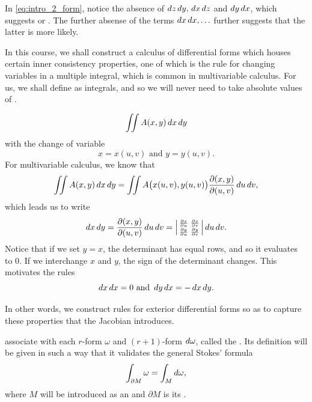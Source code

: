 \documentclass[notoc,notitlepage]{tufte-book}
\begin{document}
In \cref{eq:intro_2_form}, notice the absence of $\mathop{}\!d{z} \mathop{}\!d{y},\, \mathop{}\!d{x}
\mathop{}\!d{z}$ and $\mathop{}\!d{y} \mathop{}\!d{x}$, which suggests  or
. The further absense of the terms $\mathop{}\!d{x} \mathop{}\!d{x},
\ldots$ further suggests that the latter is more likely.

In this course, we shall construct a calculus of differential forms which houses
certain inner consistency properties, one of which is the rule for changing
variables in a multiple integral, which is common in multivariable calculus. For
us, we shall define  as  integrals, and so
we will never need to take absolute values of .

\begin{equation*}
  \iint A(x, y) \mathop{}\!d{x} \mathop{}\!d{y}
\end{equation*}
with the change of variable
\begin{equation*}
  x = x(u, v) \text{ and } y = y(u, v).
\end{equation*}
For multivariable calculus, we know that
\begin{equation*}
  \iint A(x, y) \mathop{}\!d{x} \mathop{}\!d{y} = \iint A \big( x(u, v), y(u, v) \big)
  \frac{\partial(x, y)}{\partial (u, v)} \mathop{}\!d{u} \mathop{}\!d{v},
\end{equation*}
which leads us to write
\begin{equation*}
  \mathop{}\!d{x} \mathop{}\!d{y} = \frac{\partial(x, y)}{\partial(u, v)} \mathop{}\!d{u} \mathop{}\!d{v} =
  \left|\begin{smallmatrix}
      \frac{\partial x}{\partial u} & \frac{\partial x}{\partial v} \\
      \frac{\partial y}{\partial u} & \frac{\partial y}{\partial v}
  \end{smallmatrix}\right| \mathop{}\!d{u} \mathop{}\!d{v}.
\end{equation*}
Notice that if we set $y = x$, the determinant has equal rows, and so it
evaluates to $0$. If we interchange $x$ and $y$, the sign of the determinant
changes. This motivates the rules
\begin{equation*}
  \mathop{}\!d{x} \mathop{}\!d{x} = 0 \text{ and } \mathop{}\!d{y} \mathop{}\!d{x} = - \mathop{}\!d{x} \mathop{}\!d{y}.
\end{equation*}

In other words, we construct rules for exterior differential forms so as to
capture these properties that the Jacobian introduces.

 associate with each $r$-form $\omega$ and $(r + 1)$-form
$\mathop{}\!d{\omega}$, called the . Its
definition will be given in such a way that it validates the general Stokes'
formula
\begin{equation*}
  \int_{\partial M} \omega = \int_{M} \mathop{}\!d{\omega},
\end{equation*}
where $M$ will be introduced as an  and $\partial M$ is its .
\end{document}
